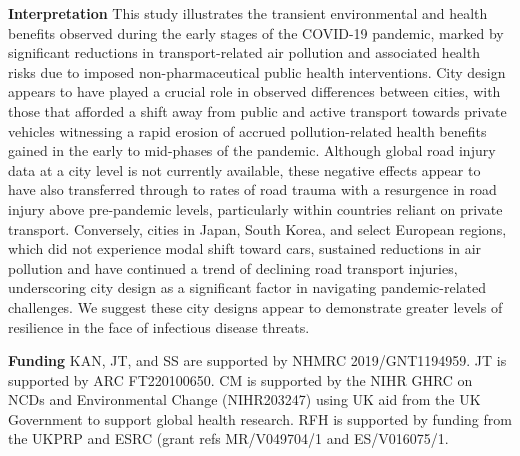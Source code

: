 \documentclass[preprint,10pt]{elsarticle} %
\newcommand{\absdiv}[1]{%
  \par\addvspace{.5\baselineskip}%
  \noindent\textbf{#1}\quad\ignorespaces}
\begin{document}
 \absdiv{\textcolor{OliveGreen}{Interpretation}}
This study illustrates the transient environmental and health benefits observed during the early stages of the COVID-19 pandemic, marked by significant reductions in transport-related air pollution and associated health risks due to imposed non-pharmaceutical public health interventions. City design appears to have played a crucial role in observed differences between cities, with those that afforded a shift away from public and active transport towards private vehicles witnessing a rapid erosion of accrued pollution-related health benefits gained in the early to mid-phases of the pandemic. Although global road injury data at a city level is not currently available, these negative effects appear to have also transferred through to rates of road trauma with a resurgence in road injury above pre-pandemic levels, particularly within countries reliant on private transport. Conversely, cities in Japan, South Korea, and select European regions, which did not experience modal shift toward cars, sustained reductions in air pollution and have continued a trend of declining road transport injuries, underscoring city design as a significant factor in navigating pandemic-related challenges. We suggest these city designs appear to demonstrate greater levels of resilience in the face of infectious disease threats. 
 \absdiv{\textcolor{OliveGreen}{Funding}}
 KAN, JT, and SS are supported by NHMRC 2019/GNT1194959. JT is supported by ARC FT220100650. CM is supported by the NIHR GHRC on NCDs and Environmental Change (NIHR203247) using UK aid from the UK Government to support global health research. RFH is supported by funding from the UKPRP and ESRC (grant refs MR/V049704/1 and ES/V016075/1.
\end{document}
